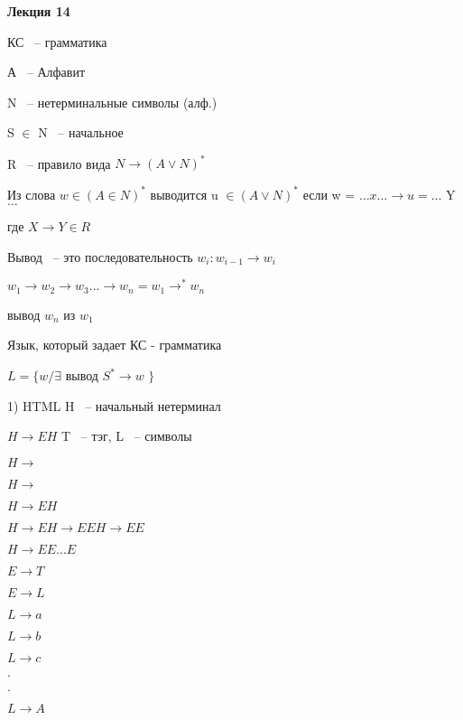 \documentclass[russian]{lecture-notes}
\begin{document}
\textbf{Лекция 14}

	КС ~-- грамматика

	А ~-- Алфавит

	N ~-- нетерминальные символы (алф.)

	S $\in$ N ~-- начальное

	R ~-- правило вида $N \rightarrow (A \lor N)^{*}$

	\begin{definition}

		Из слова $w \in ( A \in N)^{*}$ выводится u $\in (A \lor N)^{*}$ если w = $\dots x \dots \rightarrow u = \dots $ Y $\dots$

		где $X \rightarrow Y \in R$
		\end{definition}

	\begin{definition}

		Вывод ~-- это последовательность $w_{i} : w_{i-1} \rightarrow w_{i}$

		\end{definition}

	$w_{1} \rightarrow w_{2} \rightarrow w_{3} \dots \rightarrow w_{n} = w_{1} \rightarrow^{*} w_{n}$

	вывод $w_{n} $ из $w_{1}$

	\begin{definition}

		Язык, который задает КС - грамматика

		$L = \{ w/ \exists $ вывод $S^{*} \rightarrow w$ $\}$

		\end{definition}

	\begin{example}

		1) HTML \qquad H ~-- начальный нетерминал

		$H \rightarrow EH$ \qquad \qquad \qquad T ~-- тэг, L ~-- символы

		$H \rightarrow$

		$H \rightarrow $

		$H \rightarrow EH$

		$H \rightarrow EH \rightarrow EEH \rightarrow EE$

		$H \rightarrow EE \dots E$

		$E \rightarrow T$

		$E \rightarrow L$

		$L \rightarrow a$

		$L \rightarrow b$

		$L \rightarrow c$

		$.$

		$.$

		$L \rightarrow A$

		\end{example}
\end{document}
